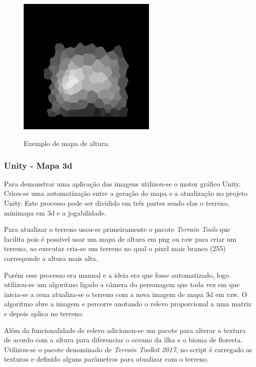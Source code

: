 \begin{figure}[!ht]
	\centering
    \caption{Exemplo de mapa de altura.}
	\includegraphics[width=0.6\textwidth]{figures/heightmap_eample.png}
	\label{fig:heightmap}
\end{figure}

\subsubsection{Unity - Mapa 3d}

Para demonstrar uma aplicação das imagens utilizou-se o motor gráfico Unity. Criou-se uma automatização entre a geração do mapa e a atualização no projeto Unity. Este processo pode ser dividido em três partes sendo elas o terreno, minimapa em 3d e a jogabilidade.


Para atualizar o terreno usou-se primeiramente o pacote \textit{Terrain Tools} que facilita pois é possível usar um mapa de altura em png ou raw para criar um terreno, ao executar cria-se um terreno no qual o pixel mais branco (255) corresponde a altura mais alta.

Porém esse processo era manual e a ideia era que fosse automatizado, logo utilizou-se um algoritmo ligado a câmera do personagem que toda vez em que inicia-se a cena atualiza-se o terreno com a nova imagem de mapa 3d em raw. O algoritmo abre a imagem e percorre anotando o relevo proporcional a uma matriz e depois aplica no terreno.

Além da funcionalidade de relevo adicionou-se um pacote para alterar a textura de acordo com a altura para diferenciar o oceano da ilha e o bioma de floresta. Utilizou-se o pacote denominado de \textit{Terrain Toolkit 2017}, no script é carregado as texturas e definido alguns parâmetros para atualizar com o terreno.

